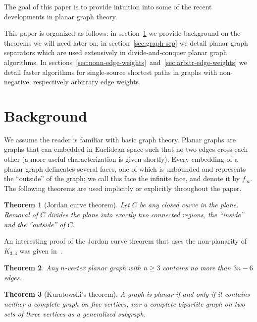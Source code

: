 \documentclass[12pt]{article}
\newtheorem{theorem}{Theorem}[section]
\begin{document}
The goal of this paper is to provide intuition into some of the recent developments in planar graph theory.

This paper is organized as follows: in section~\ref{sec:background} we provide background on the theorems we will need later on; in section~\ref{sec:graph-sep} we detail planar graph separators which are used extensively in divide-and-conquer planar graph algorithms. In sections~\ref{sec:nonn-edge-weights}~and~\ref{sec:arbitr-edge-weights} we detail faster algorithms for single-source shortest paths in graphs with non-negative, respectively arbitrary edge weights.

\section{Background}
\label{sec:background}

We assume the reader is familiar with basic graph theory. Planar graphs are graphs that can embedded in Euclidean space such that no two edges cross each other (a more useful characterization is given shortly). Every embedding of a planar graph delineates several faces, one of which is unbounded and represents the ``outside'' of the graph; we call this face the infinite face, and denote it by $f_{\infty}$. The following theorems are used implicitly or explicitly throughout the paper.\\

\begin{theorem}[Jordan curve theorem]
  Let $C$ be any closed curve in the plane. Removal of $C$ divides the plane into exactly two connected regions, the ``inside'' and the ``outside'' of $C$.
\end{theorem}

An interesting proof of the Jordan curve theorem that uses the non-planarity of $K_{3,3}$ was given in~\cite{thomassen1992jordan}.\\

\begin{theorem}
  Any $n$-vertex planar graph with $n \geq 3$ contains no more than $3n-6$ edges.\\
\end{theorem}

\begin{theorem}[Kuratowski's theorem]
  A graph is planar if and only if it contains neither a complete graph on five vertices, nor a complete bipartite graph on two sets of three vertices as a generalized subgraph.
\end{theorem}
\end{document}
